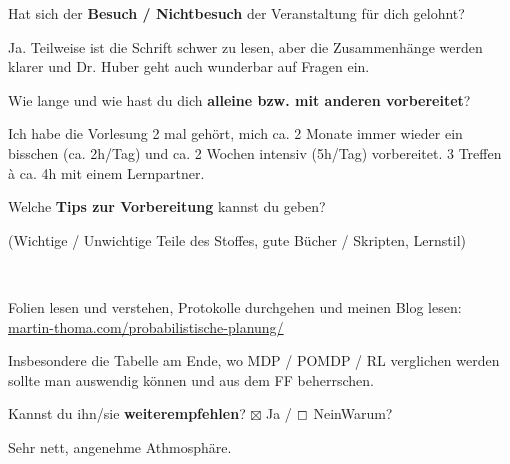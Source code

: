 \documentclass[a4paper]{article}
\begin{document}
 \begin{multicols}{2}

   Hat sich der \textbf{Besuch / Nichtbesuch} der Veranstaltung für dich gelohnt? \\
  \begin{minipage}[t][6.8cm]{\linewidth}
    Ja. Teilweise ist die Schrift schwer zu lesen, aber die Zusammenhänge werden
    klarer und Dr. Huber geht auch wunderbar auf Fragen ein.

  \end{minipage}

   Wie lange und wie hast du dich \textbf{alleine bzw. mit anderen vorbereitet}? \\
  \begin{minipage}[t][7cm]{\linewidth}
    Ich habe die Vorlesung 2 mal gehört, mich ca. 2 Monate immer wieder ein
    bisschen (ca. 2h/Tag) und ca. 2 Wochen intensiv (5h/Tag) vorbereitet.
    3 Treffen à ca. 4h mit einem Lernpartner.

  \end{minipage}

   Welche \textbf{Tips zur Vorbereitung} kannst du geben?
  \begin{footnotesize}(Wichtige / Unwichtige Teile des Stoffes, gute Bücher / Skripten, Lernstil)\end{footnotesize} \\
  \begin{minipage}[t][7cm]{\linewidth}
    Folien lesen und verstehen, Protokolle durchgehen und
    meinen Blog lesen:\\
    \href{https://martin-thoma.com/probabilistische-planung/}{martin-thoma.com/probabilistische-planung/}

    Insbesondere die Tabelle am Ende, wo MDP / POMDP / RL verglichen werden
    sollte man auswendig können und aus dem FF beherrschen.
  \end{minipage}

\columnbreak

   Kannst du ihn/sie \textbf{weiterempfehlen}?
  $\boxtimes$ Ja / $\boxempty$ Nein\newline Warum? \\
  \begin{minipage}[t][6.8cm]{\linewidth}
    Sehr nett, angenehme Athmosphäre.


\end{minipage}
\end{multicols}
\end{document}
